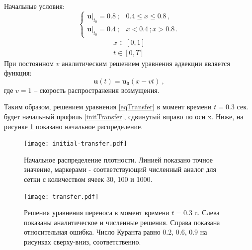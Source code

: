 \documentclass[a4paper]{article}
\begin{document}
	Начальные условия:
	\begin{equation}\label{initTransfer}
		\begin{cases}
			\left.\mathbf{u}\right|_{t_0} = 0.8\:;		&		0.4 \leqslant x \leqslant 0.8 \, ,	\\
			\left.\mathbf{u}\right|_{t_0} = 0.4\:;		&		x < 0.4\,; x > 0.8 \, .
		\end{cases}
	\end{equation}
	\[
		\begin{aligned}
			x \in [0, 1] \\
			t \in [0, T]
		\end{aligned}
	\]
	При постоянном $v$ аналитическим решением уравнения адвекции является функция:
	\begin{equation}
		\mathbf{u}(t) = \mathbf{u_0}(x - vt) \: ,
	\end{equation}
	где $v = 1$ -- скорость распространения возмущения. 
	
	Таким образом, решением уравнения \eqref{eqTransfer} в момент времени $t = 0.3$ сек. будет начальный профиль \eqref{initTransfer}, сдвинутый вправо по оси x. 
	Ниже, на рисунке \ref{initTransferPlot} показано начальное распределение.
	
	\begin{figure}[h]
		\centering
		\texttt{[image: initial-transfer.pdf]}
		\caption{Начальное распределение плотности. Линией показано точное значение, маркерами - соответствующий численный аналог для сетки с количеством ячеек 30, 100 и 1000.}
		\label{initTransferPlot}
	\end{figure}
	\begin{figure}[!h]
	\centering
	\texttt{[image: transfer.pdf]}
	\caption{Решения уравнения переноса в момент времени $t = 0.3$ c. Слева показаны аналитическое и  численные решения. Справа показана относительная ошибка. Число Куранта равно 0.2, 0.6, 0.9 на рисунках сверху-вниз, соответственно.}
	\label{TransferPlot}
	\end{figure}
	
\end{document}
